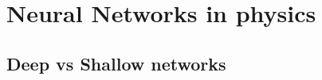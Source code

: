 \section{Neural Networks in physics}\label{sec:Neural Networks in physics}

\subsection{Deep vs Shallow networks}